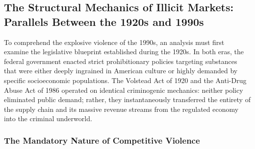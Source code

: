 \documentclass[
]{article}
\begin{document}
\subsection{\texorpdfstring{\textbf{The Structural Mechanics of Illicit
Markets: Parallels Between the 1920s and
1990s}}{The Structural Mechanics of Illicit Markets: Parallels Between the 1920s and 1990s}}\label{the-structural-mechanics-of-illicit-markets-parallels-between-the-1920s-and-1990s}

To comprehend the explosive violence of the 1990s, an analysis must
first examine the legislative blueprint established during the 1920s. In
both eras, the federal government enacted strict prohibitionary policies
targeting substances that were either deeply ingrained in American
culture or highly demanded by specific socioeconomic populations. The
Volstead Act of 1920 and the Anti-Drug Abuse Act of 1986 operated on
identical criminogenic mechanics: neither policy eliminated public
demand; rather, they instantaneously transferred the entirety of the
supply chain and its massive revenue streams from the regulated economy
into the criminal underworld.

\subsubsection{\texorpdfstring{\textbf{The Mandatory Nature of
Competitive
Violence}}{The Mandatory Nature of Competitive Violence}}\label{the-mandatory-nature-of-competitive-violence}
\end{document}
